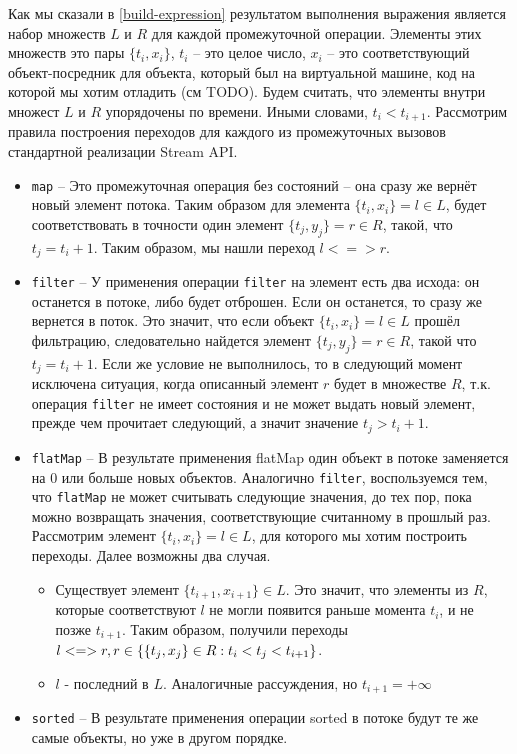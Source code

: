 Как мы сказали в \ref{build-expression} результатом выполнения выражения является набор множеств $L$ и $R$ для каждой промежуточной операции. Элементы этих множеств это пары $\{t_i, x_i\}$, $t_i$ -- это целое число, $x_i$ -- это соответствующий объект-посредник для объекта, который был на виртуальной машине, код на которой мы хотим отладить (см TODO). Будем считать, что элементы внутри множест $L$ и $R$ упорядочены по времени. Иными словами, $t_i < t_{i + 1}$. Рассмотрим правила построения переходов для каждого из промежуточных вызовов стандартной реализации Stream API.
\begin{itemize}
	\item \texttt{map} -- Это промежуточная операция без состояний -- она сразу же вернёт новый элемент потока. Таким образом для элемента $\{t_i, x_i\} = l \in L$, будет соответствовать в точности один элемент $\{t_j, y_j\} = r \in R$, такой, что $t_j = t_i + 1$. Таким образом, мы нашли переход $l <=> r$.
	\item \texttt{filter} -- У применения операции \texttt{filter} на элемент есть два исхода: он останется в потоке, либо будет отброшен. Если он останется, то сразу же вернется в поток. Это значит, что если объект $\{t_i, x_i\} = l \in L$ прошёл фильтрацию, следовательно найдется элемент $\{t_j, y_j\} = r \in R$, такой что $t_j = t_i + 1$. Если же условие не выполнилось, то в следующий момент исключена ситуация, когда описанный элемент $r$ будет в множестве $R$, т.к. операция \texttt{filter} не имеет состояния и не может выдать новый элемент, прежде чем прочитает следующий, а значит значение $t_j > t_i + 1$. 
	\item \texttt{flatMap} -- В результате применения flatMap один объект в потоке заменяется на 0 или больше новых объектов. Аналогично \texttt{filter}, воспользуемся тем, что \texttt{flatMap} не может считывать следующие значения, до тех пор, пока можно возвращать значения, соответствующие считанному в прошлый раз. Рассмотрим элемент $\{t_i, x_i\} = l \in L$, для которого мы хотим построить переходы. Далее возможны два случая.
	\begin{itemize}
		\item Существует элемент $\{t_{i + 1}, x_{i + 1}\} \in L$. Это значит, что элементы из $R$, которые соответствуют $l$ не могли появится раньше момента $t_i$, и не позже $t_{i + 1}$. Таким образом, получили переходы $l <=> r, \\ r \in \{\{t_j, x_j\} \in R : t_i < t_j < t_{i + 1}\}$.
		\item $l$ - последний в $L$. Аналогичные рассуждения, но $t_{i + 1} = +\infty$
	\end{itemize}
	\item \texttt{sorted} -- В результате применения операции sorted в потоке будут те же самые объекты, но уже в другом порядке. 
\end{itemize}

